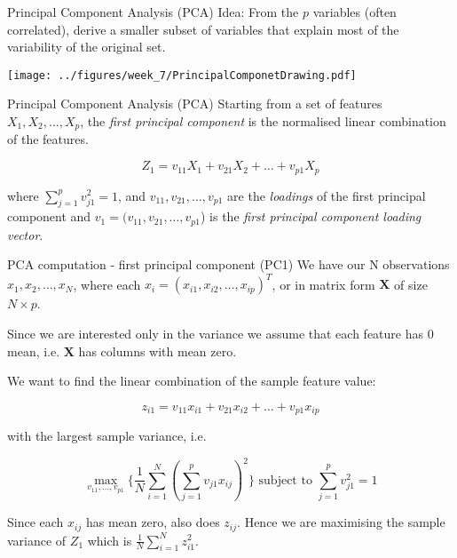 \documentclass[notes]{beamer}          %
\begin{document}
\begin{frame}{Principal Component Analysis (PCA)}
Idea: From the $p$ variables (often correlated), derive a smaller subset of variables that explain most of the variability of the original set.
\vspace{2mm} 
\begin{center}
\texttt{[image: ../figures/week\_7/PrincipalComponetDrawing.pdf]}  
\end{center}
\end{frame}

\begin{frame}{Principal Component Analysis (PCA)}
Starting from a set of features $X_1, X_2, \dots, X_p$, the \textit{first principal component} is the normalised linear combination of the features.

\begin{equation*}
	Z_1 =v_{11}X_1 + v_{21}X_2 + \dots + v_{p1}X_p
\end{equation*}

where $\sum_{j=1}^{p}v_{j1}^2=1$, and $v_{11}, v_{21}, \dots, v_{p1}$ are the \textit{loadings} of the first principal component and $v_1=(v_{11}, v_{21}, \dots, v_{p1}$) is the \textit{first principal component loading vector}.
\end{frame}

\begin{frame}{PCA computation - first principal component (PC1)}
We have our N observations $x_1, x_2,  \dots, x_N$, where each $x_i= (x_{i1}, x_{i2}, \dots, x_{ip})^T$, or in matrix form $\mathbf X$ of size $N \times p$.

\vspace{2mm} 

Since we are interested only in the variance we assume that each feature has 0 mean, i.e. $\mathbf X$  has columns with mean zero.

\vspace{2mm} 

We want to find the linear combination of the sample feature value:

\begin{equation*}
	z_{i1} =v_{11}x_{i1} + v_{21}x_{i2} + \dots + v_{p1}x_{ip}
\end{equation*}

with the largest sample variance, i.e.

\begin{equation*}
\max_{v_{11}, \dots, v_{p1}}  \{\frac{1}{N} \sum_{i=1}^N (\sum_{j=1}^p v_{j1}x_{ij})^2\} \text{     subject to   } \sum_{j=1}^{p}v_{j1}^2=1
\end{equation*}

Since each $x_{ij}$ has mean zero, also does $z_{ij}$. Hence we are maximising the sample variance of $Z_{1}$ which is $\frac{1}{N}\sum_{i=1}^N z_{i1}^2$.

\end{frame}
\end{document}
